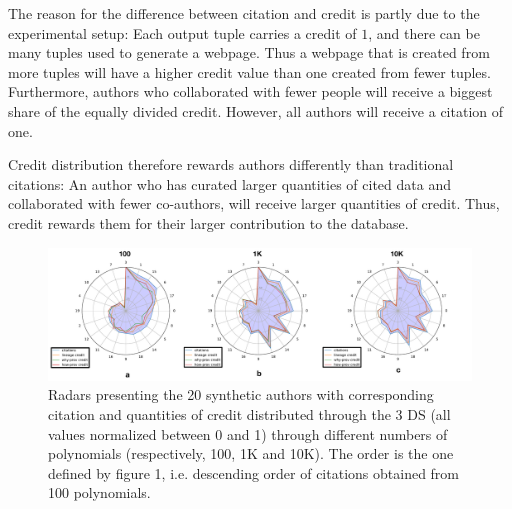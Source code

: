 The reason for the difference between citation and credit is partly due to the experimental setup:  Each output tuple carries a credit of $1$, and there can be many tuples used to generate a webpage.  Thus a webpage that is created from more tuples will have a higher credit value than one created from fewer tuples. Furthermore, authors who collaborated with fewer people will receive a biggest share of the equally divided credit.  However, all authors will receive a citation of one.

Credit distribution therefore rewards authors differently than traditional citations: An author who has curated larger quantities of cited data and collaborated with fewer co-authors, will receive larger quantities of credit. Thus, credit rewards them for their larger contribution to the database. 




\begin{figure}[t]
\centering
  \includegraphics[width=1\textwidth]{figures/fixed_radars}
  \caption{
  Radars presenting the 20 synthetic authors with corresponding citation and quantities of credit distributed through the 3 DS (all values normalized between 0 and 1) through different numbers of polynomials (respectively, 100, 1K and 10K). 
  The order is the one defined by figure 1, i.e. descending order of citations  obtained from 100 polynomials. }
  \label{figure:3_radars}
\end{figure}

